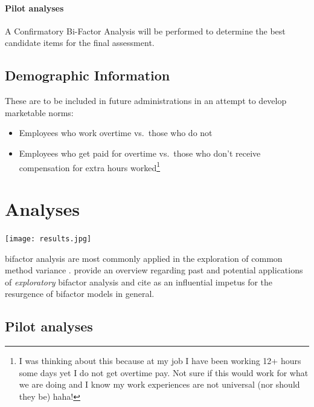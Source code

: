 \documentclass[
]{book}
\providecommand{\tightlist}{%
  \setlength{\itemsep}{0pt}\setlength{\parskip}{0pt}}
\begin{document}
\hypertarget{pilot-analyses}{%
\subsubsection{Pilot analyses}\label{pilot-analyses}}

A Confirmatory Bi-Factor Analysis will be performed to determine the best candidate items for the final assessment.

\hypertarget{demographic-information}{%
\section{Demographic Information}\label{demographic-information}}

These are to be included in future administrations in an attempt to develop marketable norms:

\begin{itemize}
\tightlist
\item
  Employees who work overtime vs.~those who do not
\item
  Employees who get paid for overtime vs.~those who don't receive compensation for extra hours worked\footnote{I was thinking about this because at my job I have been working 12+ hours some days yet I do not get overtime pay. Not sure if this would work for what we are doing and I know my work experiences are not universal (nor should they be) haha!}
\end{itemize}

\hypertarget{analyses}{%
\chapter{Analyses}\label{analyses}}

\texttt{[image: results.jpg]}

bifactor analysis are most commonly applied in the exploration of common method variance \citep[see, for example,][]{reise_rediscovery_2012, rodriguez_evaluating_2016}. \citet{giordano_exploratory_2020} provide an overview regarding past and potential applications of \emph{exploratory} bifactor analysis and cite \citet{reise_rediscovery_2012} as an influential impetus for the resurgence of bifactor models in general.

\hypertarget{pilot-analyses-1}{%
\section{Pilot analyses}\label{pilot-analyses-1}}
\end{document}
